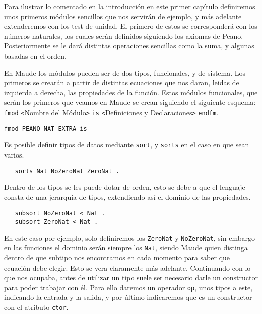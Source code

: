 
Para ilustrar lo comentado en la introducción en este primer capítulo definiremos unos primeros módulos sencillos que nos servirán de ejemplo, y más adelante extenderemos con los test de unidad.
El primero de estos se corresponderá con los números naturales, los cuales serán definidos siguiendo los axiomas de Peano. Posteriormente se le dará distintas operaciones sencillas como la suma, y algunas basadas en el orden.\par

En Maude los módulos pueden ser de dos tipos, funcionales, y de sistema. Los primeros se crearán a partir de distintas ecuaciones que nos daran, leidas de izquierda a derecha, las propiedades de la función. Estos módulos funcionales, que serán los primeros que veamos en Maude se crean siguiendo el siguiente esquema: \texttt{fmod} \verb"<"Nombre del Módulo\verb">" \texttt{is} \verb"<"Definiciones y Declaraciones\verb">" \texttt{endfm}.\par

{\codesize
\begin{verbatim}
fmod PEANO-NAT-EXTRA is
\end{verbatim}
}

Es posible definir tipos de datos mediante \texttt{sort}, y \texttt{sorts} en el caso en que sean varios. \par

{\codesize
\begin{verbatim}
   sorts Nat NoZeroNat ZeroNat .
\end{verbatim}
}

Dentro de los tipos se les puede dotar de orden, esto se debe a que el lenguaje consta de una jerarquía de tipos, extendiendo así el dominio de las propiedades. \par

{\codesize
\begin{verbatim}
   subsort NoZeroNat < Nat .
   subsort ZeroNat < Nat .
\end{verbatim}
}

En este caso por ejemplo, solo definiremos los \texttt{ZeroNat} y \texttt{NoZeroNat}, sin embargo en las funciones el dominio serán siempre los \texttt{Nat}, siendo Maude quien distinga dentro de que subtipo nos encontramos en cada momento para saber que ecuación debe elegir. Esto se vera claramente más adelante. Continuando con lo que nos ocupaba, antes de utilizar un tipo suele ser necesario darle un constructor para poder trabajar con él. Para ello daremos un operador \texttt{op}, unos tipos a este, indicando la entrada y la salida, y por último indicaremos que es un constructor con el atributo \texttt{ctor}. \par

